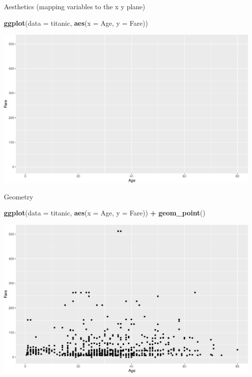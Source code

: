\documentclass[
]{book}
\newenvironment{Shaded}{\begin{snugshade}}{\end{snugshade}}
\newcommand{\DataTypeTok}[1]{\textcolor[rgb]{0.13,0.29,0.53}{#1}}
\newcommand{\KeywordTok}[1]{\textcolor[rgb]{0.13,0.29,0.53}{\textbf{#1}}}
\newcommand{\NormalTok}[1]{#1}
\newcommand{\OperatorTok}[1]{\textcolor[rgb]{0.81,0.36,0.00}{\textbf{#1}}}
\newcommand{\StringTok}[1]{\textcolor[rgb]{0.31,0.60,0.02}{#1}}
\begin{document}
Aesthetics (mapping variables to the x y plane)

\begin{Shaded}
\begin{Highlighting}[]
\KeywordTok{ggplot}\NormalTok{(}\DataTypeTok{data =}\NormalTok{ titanic, }\KeywordTok{aes}\NormalTok{(}\DataTypeTok{x =}\NormalTok{ Age, }\DataTypeTok{y =}\NormalTok{ Fare))}
\end{Highlighting}
\end{Shaded}

\includegraphics{figures/unnamed-chunk-135-1.pdf}

Geometry

\begin{Shaded}
\begin{Highlighting}[]
\KeywordTok{ggplot}\NormalTok{(}\DataTypeTok{data =}\NormalTok{ titanic, }\KeywordTok{aes}\NormalTok{(}\DataTypeTok{x =}\NormalTok{ Age, }\DataTypeTok{y =}\NormalTok{ Fare)) }\OperatorTok{+}\StringTok{ }\KeywordTok{geom_point}\NormalTok{()}
\end{Highlighting}
\end{Shaded}

\includegraphics{figures/unnamed-chunk-136-1.pdf}
\end{document}
